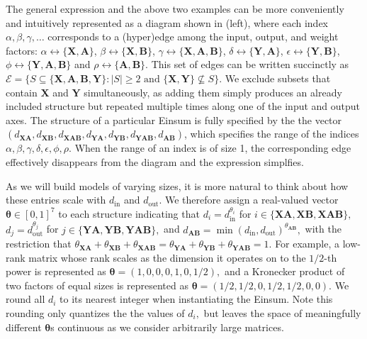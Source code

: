 \documentclass{article}
\newcommand{\mbf}[1]{{\boldsymbol{\mathbf{#1}}}}
\newcommand{\bm}{\mbf}
\newcommand{\set}[1]{\{#1\}}
\newcommand{\din}{{d_\mathrm{in}}}
\newcommand{\dout}{{d_\mathrm{out}}}
\begin{document}
The general expression and the above two examples can be more conveniently and intuitively represented as a diagram shown in  (left), where each index $\alpha, \beta, \gamma, \ldots$ corresponds to a (hyper)edge among the input, output, and weight factors: $\alpha \leftrightarrow \set{\bm{X}, \bm{A}}$,
$\beta \leftrightarrow \set{\bm{X}, \bm{B}}$, $\gamma \leftrightarrow \set{\bm{X}, \bm{A}, \bm{B}}$,
$\delta \leftrightarrow \set{\bm{Y}, \bm{A}}$, $\epsilon \leftrightarrow \set{\bm{Y}, \bm{B}}$,
$\phi \leftrightarrow \set{\bm{Y}, \bm{A}, \bm{B}}$ and $\rho \leftrightarrow \set{\bm{A}, \bm{B}}$.
This set of edges can be written succinctly as $\mathcal{E} = \set{S \subseteq \set{\bm{X}, \bm{A}, \bm{B}, \bm{Y}}: \left|S \right| \geq 2
\text{  and  } \set{\bm{X}, \bm{Y}} \not\subseteq S}$.
We exclude subsets that contain $\bm{X}$ and $\bm{Y}$ simultaneously, as adding them simply produces an already included structure but repeated multiple times along one of the input and output axes.
The structure of a particular Einsum is fully specified by the the vector $(d_{\bm{X}\bm{A}}, d_{\bm{X}\bm{B}}, d_{\bm{X}\bm{A} \bm{B}}, d_{\bm{Y}\bm{A}}, d_{\bm{Y}\bm{B}}, d_{\bm{Y}\bm{A} \bm{B}},
d_{\bm{A}\bm{B}})$, which specifies the range of the indices $\alpha, \beta, \gamma, \delta, \epsilon, \phi, \rho$.
When the range of an index is of size 1, the corresponding edge effectively disappears from the diagram and the expression simplfies.

As we will build models of varying sizes, it is more natural to think about how these entries scale with $\din$ and $\dout$.
We therefore assign a real-valued vector $\bm{\theta} \in \left[0, 1\right]^{7}$ to each structure indicating that $d_{i} = d_\mathrm{in}^{\theta_{i}}$ for $i \in \{\bm{X}\bm{A}, \bm{X}\bm{B}, \bm{X}\bm{A}\bm{B}\},$
$d_{j} = {d_\mathrm{out}^{\theta_{j}}}$ for $j \in \{\bm{Y}\bm{A}, \bm{Y}\bm{B}, \bm{Y}\bm{A}\bm{B}\},$ and $d_{\bm{AB}} = \min(\din, \dout)^{\theta_{\bm{AB}}},$ with the restriction that $\theta_{\bm{X}\bm{A}} + \theta_{\bm{X}\bm{B}} + \theta_{\bm{X}\bm{A} \bm{B}} = \theta_{\bm{Y}\bm{A}} + \theta_{\bm{Y}\bm{B}} + \theta_{\bm{Y}\bm{A} \bm{B}} = 1$.
For example, a low-rank matrix whose rank scales as the dimension it operates on to the $1/2$-th power is represented as $\bm{\theta}=(1, 0, 0, 0, 1, 0, 1/2),$ and a Kronecker product of two factors of equal sizes is represented as $\bm{\theta}=(1/2, 1/2, 0, 1/2, 1/2, 0, 0)$.
We round all $d_i$ to its nearest integer when instantiating the Einsum. Note this rounding only quantizes the the values of $d_i,$ but leaves the space of meaningfully different $\bm{\theta}$s continuous as we consider arbitrarily large matrices.
\end{document}
